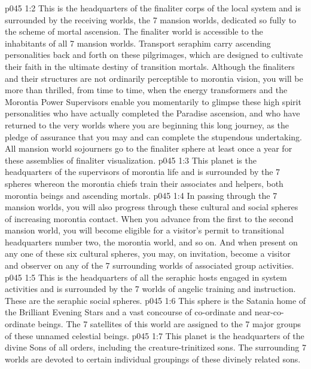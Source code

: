 \vs p045 1:2 \pc {} This is the headquarters of the finaliter corps of the local system and is surrounded by the receiving worlds, the 7 mansion worlds, dedicated so fully to the scheme of mortal ascension. The finaliter world is accessible to the inhabitants of all 7 mansion worlds. Transport seraphim carry ascending personalities back and forth on these pilgrimages, which are designed to cultivate their faith in the ultimate destiny of transition mortals. Although the finaliters and their structures are not ordinarily perceptible to morontia vision, you will be more than thrilled, from time to time, when the energy transformers and the Morontia Power Supervisors enable you momentarily to glimpse these high spirit personalities who have actually completed the Paradise ascension, and who have returned to the very worlds where you are beginning this long journey, as the pledge of assurance that you may and can complete the stupendous undertaking. All mansion world sojourners go to the finaliter sphere at least once a year for these assemblies of finaliter visualization.
\vs p045 1:3 \pc {} This planet is the headquarters of the supervisors of morontia life and is surrounded by the 7 spheres whereon the morontia chiefs train their associates and helpers, both morontia beings and ascending mortals.
\vs p045 1:4 In passing through the 7 mansion worlds, you will also progress through these cultural and social spheres of increasing morontia contact. When you advance from the first to the second mansion world, you will become eligible for a visitor’s permit to transitional headquarters number two, the morontia world, and so on. And when present on any one of these six cultural spheres, you may, on invitation, become a visitor and observer on any of the 7 surrounding worlds of associated group activities.
\vs p045 1:5 \pc {} This is the headquarters of all the seraphic hosts engaged in system activities and is surrounded by the 7 worlds of angelic training and instruction. These are the seraphic social spheres.
\vs p045 1:6 \pc {} This sphere is the Satania home of the Brilliant Evening Stars and a vast concourse of co\hyp{}ordinate and near\hyp{}co\hyp{}ordinate beings. The 7 satellites of this world are assigned to the 7 major groups of these unnamed celestial beings.
\vs p045 1:7 \pc {} This planet is the headquarters of the divine Sons of all orders, including the creature\hyp{}trinitized sons. The surrounding 7 worlds are devoted to certain individual groupings of these divinely related sons.
